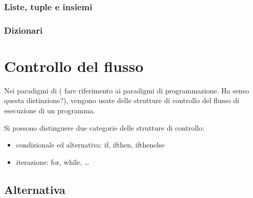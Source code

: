 \documentclass[letterpaper,10pt,english]{jupyterBook}
\begin{document}
\subsection{Liste, tuple e insiemi}
\label{\detokenize{ch/programming/types:liste-tuple-e-insiemi}}

\subsection{Dizionari}
\label{\detokenize{ch/programming/types:dizionari}}
\sphinxstepscope


\chapter{Controllo del flusso}
\label{\detokenize{ch/programming/flow_control:controllo-del-flusso}}\label{\detokenize{ch/programming/flow_control::doc}}
\sphinxAtStartPar
Nei paradigmi di  ( fare riferimento ai paradigmi di programmazione. Ha senso questa distinzione?), vengono usate delle strutture di controllo del flusso di esecuzione di un programma.

\sphinxAtStartPar
Si possono distinguere due categorie delle strutture di controllo:
\begin{itemize}
\item {} 
\sphinxAtStartPar
condizionale ed alternativa: if, if\sphinxhyphen{}then, if\sphinxhyphen{}then\sphinxhyphen{}else

\item {} 
\sphinxAtStartPar
iterazione: for, while, …

\end{itemize}


\section{Alternativa}
\label{\detokenize{ch/programming/flow_control:alternativa}}
\end{document}
